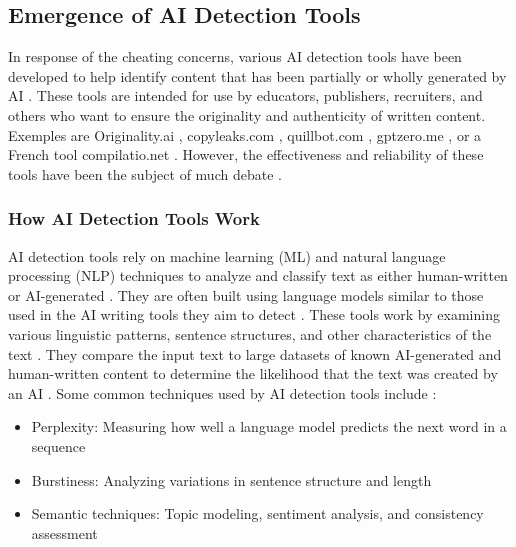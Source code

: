 \documentclass{article}
\begin{document}
\subsection{Emergence of AI Detection Tools}
In response of the cheating concerns, various AI detection tools have been developed to help identify content that has been partially or wholly generated by AI \cite{https://kb.iu.edu/d/bimt}. These tools are intended for use by educators, publishers, recruiters, and others who want to ensure the originality and authenticity of written content. Exemples are Originality.ai \cite{https://originality.ai/}, copyleaks.com \cite{https://copyleaks.com}, quillbot.com \cite{https://quillbot.com/}, gptzero.me \cite{https://gptzero.me/}, or a French tool compilatio.net \cite{https://www.compilatio.net/ia-detecteur-info}. However, the effectiveness and reliability of these tools have been the subject of much debate \cite{https://www.scribbr.com/ai-tools/how-do-ai-detectors-work/} \cite{https://contadu.com/ai-detection-tools-the-challenge-of-todays-digital-age/} \cite{https://edintegrity.biomedcentral.com/articles/10.1007/s40979-023-00140-5}.
\subsubsection{How AI Detection Tools Work}
AI detection tools rely on machine learning (ML) and natural language processing (NLP) techniques to analyze and classify text as either human-written or AI-generated \cite{https://surferseo.com/blog/how-do-ai-content-detectors-work/} \cite{https://contadu.com/ai-detection-tools-the-challenge-of-todays-digital-age/}. They are often built using language models similar to those used in the AI writing tools they aim to detect \cite{https://www.scribbr.com/ai-tools/how-do-ai-detectors-work/}. These tools work by examining various linguistic patterns, sentence structures, and other characteristics of the text \cite{https://surferseo.com/blog/how-do-ai-content-detectors-work/} \cite{https://contadu.com/ai-detection-tools-the-challenge-of-todays-digital-age/}. They compare the input text to large datasets of known AI-generated and human-written content to determine the likelihood that the text was created by an AI \cite{https://www.scribbr.com/ai-tools/how-do-ai-detectors-work/} \cite{https://contadu.com/ai-detection-tools-the-challenge-of-todays-digital-age/}. Some common techniques used by AI detection tools include \cite{https://surferseo.com/blog/how-do-ai-content-detectors-work/} \cite{https://contadu.com/ai-detection-tools-the-challenge-of-todays-digital-age/}:
\begin{itemize}
    \item Perplexity: Measuring how well a language model predicts the next word in a sequence
    \item Burstiness: Analyzing variations in sentence structure and length
    \item Semantic techniques: Topic modeling, sentiment analysis, and consistency assessment
\end{itemize}
\end{document}
